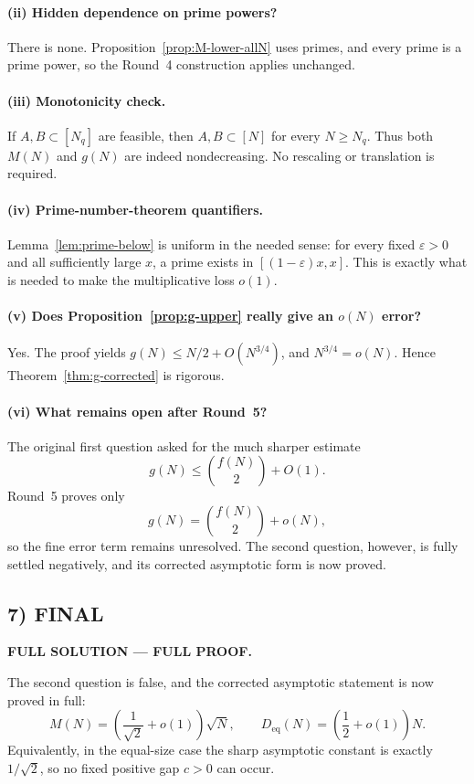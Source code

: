\paragraph{(ii) Hidden dependence on prime powers?}
There is none.  Proposition~\ref{prop:M-lower-allN} uses primes, and every prime is a prime power, so the Round~4 construction applies unchanged.

\paragraph{(iii) Monotonicity check.}
If $A,B\subset[N_q]$ are feasible, then $A,B\subset[N]$ for every $N\ge N_q$.  Thus both $M(N)$ and $g(N)$ are indeed nondecreasing.  No rescaling or translation is required.

\paragraph{(iv) Prime-number-theorem quantifiers.}
Lemma~\ref{lem:prime-below} is uniform in the needed sense: for every fixed $\varepsilon>0$ and all sufficiently large $x$, a prime exists in $[(1-\varepsilon)x,x]$.  This is exactly what is needed to make the multiplicative loss $o(1)$.

\paragraph{(v) Does Proposition~\ref{prop:g-upper} really give an $o(N)$ error?}
Yes.  The proof yields $g(N)\le N/2+O(N^{3/4})$, and $N^{3/4}=o(N)$.  Hence Theorem~\ref{thm:g-corrected} is rigorous.

\paragraph{(vi) What remains open after Round~5?}
The original first question asked for the much sharper estimate
\[
g(N)\le \binom{f(N)}2+O(1).
\]
Round~5 proves only
\[
g(N)=\binom{f(N)}2+o(N),
\]
so the fine error term remains unresolved.  The second question, however, is fully settled negatively, and its corrected asymptotic form is now proved.

\subsection{7) FINAL}

\textbf{FULL SOLUTION --- FULL PROOF.}

The second question is false, and the corrected asymptotic statement is now proved in full:
\[
M(N)=\left(\frac1{\sqrt2}+o(1)\right)\sqrt N,
\qquad
D_{\mathrm{eq}}(N)=\left(\frac12+o(1)\right)N.
\]
Equivalently, in the equal-size case the sharp asymptotic constant is exactly $1/\sqrt2$, so no fixed positive gap $c>0$ can occur.

